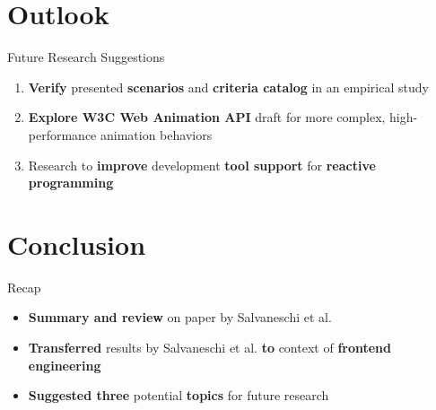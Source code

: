 \documentclass{beamer}
\begin{document}
\section{Outlook}
\begin{frame}{Future Research Suggestions}
	\begin{enumerate}
		\item \textbf{Verify} presented \textbf{scenarios} and \textbf{criteria catalog} in an empirical study\bigskip
		\item \textbf{Explore W3C Web Animation API} draft for more complex, high-performance animation behaviors\bigskip
		\item Research to \textbf{improve} development \textbf{tool support} for \textbf{reactive programming}
	\end{enumerate}
\end{frame}


\section{Conclusion}
\begin{frame}{Recap}
	\begin{itemize}
		\item \textbf{Summary and review} on paper by Salvaneschi et al. \cite{7827078}\bigskip
		\item \textbf{Transferred} results by Salvaneschi et al. \textbf{to} context of \textbf{frontend engineering}\bigskip
		\item \textbf{Suggested three} potential \textbf{topics} for future research
	\end{itemize}
\end{frame}

\end{document}
